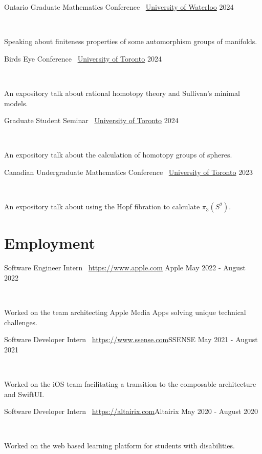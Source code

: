 \documentclass[]{style}
\begin{document}
\begin{entrylist}

\vspace{1mm}

\entry
{Ontario Graduate Mathematics Conference \ {\normalfont \underline{University of Waterloo}}}
{2024}
{ ~ \vspace{-2.5mm}

Speaking about finiteness properties of some automorphism groups of manifolds.}

\entry
{Birds Eye Conference \ {\normalfont \underline{University of Toronto}}}
{2024}
{ ~ \vspace{-2.5mm}

An expository talk about rational homotopy theory and Sullivan's minimal models.}

\entry
{Graduate Student Seminar \ {\normalfont \underline{University of Toronto}}}
{2024}
{ ~ \vspace{-2.5mm}

An expository talk about the calculation of homotopy groups of spheres.}

\entry
{Canadian Undergraduate Mathematics Conference \ {\normalfont \underline{University of Toronto}}}
{2023}
{ ~ \vspace{-2.5mm}

An expository talk about using the Hopf fibration to calculate $\pi_3(S^2)$.}

\end{entrylist}

\section{Employment}

\begin{entrylist}

\vspace{1mm}

\entry
{Software Engineer Intern \ {\normalfont \url{https://www.apple.com}{Apple}}}
{May 2022 - August 2022}
{ ~ \vspace{-2.5mm}

Worked on the team architecting Apple Media Apps solving unique technical challenges. }

\entry
{Software Developer Intern \ {\normalfont \url{https://www.ssense.com}{SSENSE}}}
{May 2021 - August 2021}
{ ~ \vspace{-2.5mm}

Worked on the iOS team facilitating a transition to the composable architecture and SwiftUI.}

\entry
{Software Developer Intern \ {\normalfont \url{https://altairix.com}{Altairix}}}
{May 2020 - August 2020}
{ ~ \vspace{-2.5mm}

Worked on the web based learning platform for students with disabilities.}

\end{entrylist}
\end{document}
